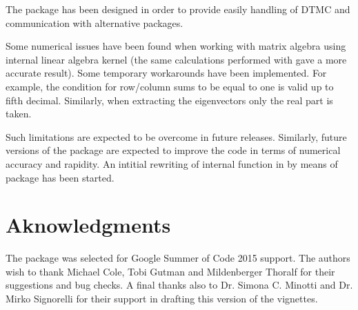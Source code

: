 \documentclass[nojss]{jss}
\begin{document}
The  package has been designed in order to provide easily handling of DTMC and communication with alternative packages.

Some numerical issues have been found when working with matrix algebra using
 internal linear algebra kernel (the same calculations performed
with  gave a more accurate result).
Some temporary workarounds have been implemented. For example, the condition for row/column sums to be equal to
one is valid up to fifth decimal. Similarly, when extracting the eigenvectors
only the real part is taken.

Such limitations are expected to be overcome in future releases. Similarly,
future versions of the package are expected to improve the code in terms of numerical accuracy and rapidity.
An intitial rewriting of internal function in  by means of  package \citep{RcppR} has been started.


\section*{Aknowledgments}\label{sec:aknowledgements}

The package was selected for Google Summer of Code 2015 support. The authors wish to thank Michael Cole, Tobi Gutman and Mildenberger Thoralf for their suggestions and bug checks. A final thanks also to Dr. Simona C. Minotti and Dr. Mirko Signorelli for their support in drafting this version of the vignettes.   


\end{document}
